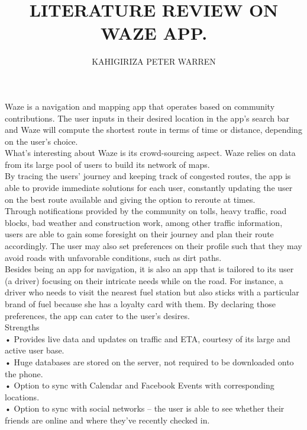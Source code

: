 \documentclass[]{article}
\author{KAHIGIRIZA PETER WARREN}
\title{LITERATURE REVIEW ON WAZE APP.}
\begin{document}
\maketitle
Waze is a navigation and mapping app that operates based on community contributions. The user inputs in their desired location in the app's search bar and Waze will compute the shortest route in terms of time or distance, depending on the user's choice.\\
 What's interesting about Waze is its crowd-sourcing aspect. Waze relies on data from its large pool of users to build its network of maps. \\
 By tracing the users' journey and keeping track of congested routes, the app is able to provide immediate solutions for each user, constantly updating the user on the best route available and giving the option to reroute at times. \\
 Through notifications provided by the community on tolls, heavy traffic, road blocks, bad weather and construction work, among other traffic information, users are able to gain some foresight on their journey and plan their route accordingly. The user may also set preferences on their profile such that they may avoid roads with unfavorable conditions, such as dirt paths. \\
 Besides being an app for navigation, it is also an app that is tailored to its user (a driver) focusing on their intricate needs while on the road. For instance, a driver who needs to visit the nearest fuel station but also sticks with a particular brand of fuel because she has a loyalty card with them. By declaring those preferences, the app can cater to the user's desires.\cite{r1} 
\\

Strengths\\

 • Provides live data and updates on traffic and ETA, courtesy of its large and active user base.\\
 
 • Huge databases are stored on the server, not required to be downloaded onto the phone. \\
 
• Option to sync with Calendar and Facebook Events with corresponding locations. \\

• Option to sync with social networks – the user is able to see whether their friends are online and where they've recently checked in. \\
\end{document}
